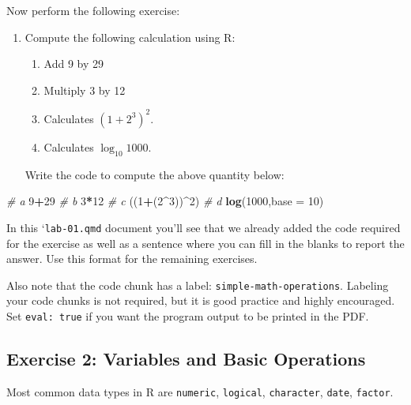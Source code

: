 \documentclass[
]{article}
\newenvironment{Shaded}{\begin{snugshade}}{\end{snugshade}}
\newcommand{\AttributeTok}[1]{\textcolor[rgb]{0.13,0.29,0.53}{#1}}
\newcommand{\CommentTok}[1]{\textcolor[rgb]{0.56,0.35,0.01}{\textit{#1}}}
\newcommand{\DecValTok}[1]{\textcolor[rgb]{0.00,0.00,0.81}{#1}}
\newcommand{\FunctionTok}[1]{\textcolor[rgb]{0.13,0.29,0.53}{\textbf{#1}}}
\newcommand{\NormalTok}[1]{#1}
\newcommand{\SpecialCharTok}[1]{\textcolor[rgb]{0.81,0.36,0.00}{\textbf{#1}}}
\providecommand{\tightlist}{%
  \setlength{\itemsep}{0pt}\setlength{\parskip}{0pt}}
\begin{document}
Now perform the following exercise:

\begin{enumerate}
\def\labelenumi{\arabic{enumi}.}
\item
  Compute the following calculation using R:

  \begin{enumerate}
  \def\labelenumii{\alph{enumii}.}
  \tightlist
  \item
    Add 9 by 29
  \item
    Multiply 3 by 12
  \item
    Calculates \((1+2^3)^2\).
  \item
    Calculates \(\log_{10} 1000\).
  \end{enumerate}

  Write the code to compute the above quantity below:
\end{enumerate}

\begin{Shaded}
\begin{Highlighting}[]
\CommentTok{\# a}
\DecValTok{9}\SpecialCharTok{+}\DecValTok{29}
\CommentTok{\# b}
\DecValTok{3}\SpecialCharTok{*}\DecValTok{12}
\CommentTok{\# c}
\NormalTok{((}\DecValTok{1}\SpecialCharTok{+}\NormalTok{(}\DecValTok{2}\SpecialCharTok{\^{}}\DecValTok{3}\NormalTok{))}\SpecialCharTok{\^{}}\DecValTok{2}\NormalTok{)}
\CommentTok{\# d}
\FunctionTok{log}\NormalTok{(}\DecValTok{1000}\NormalTok{,}\AttributeTok{base =} \DecValTok{10}\NormalTok{)}
\end{Highlighting}
\end{Shaded}

In this `\texttt{lab-01.qmd\textasciigrave{}} document you'll see that
we already added the code required for the exercise as well as a
sentence where you can fill in the blanks to report the answer. Use this
format for the remaining exercises.

Also note that the code chunk has a label:
\texttt{simple-math-operations}. Labeling your code chunks is not
required, but it is good practice and highly encouraged. Set
\texttt{eval:\ true} if you want the program output to be printed in the
PDF.

\subsection{Exercise 2: Variables and Basic
Operations}\label{exercise-2-variables-and-basic-operations}

Most common data types in R are \texttt{numeric}, \texttt{logical},
\texttt{character}, \texttt{date}, \texttt{factor}.
\end{document}
